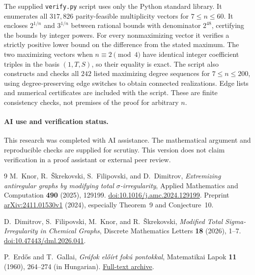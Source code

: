 \documentclass[11pt]{article}
\begin{document}
The supplied \texttt{verify.py} script uses only the Python standard
library. It enumerates all $317{,}826$ parity-feasible multiplicity vectors for
$7\leq n\leq60$. It encloses $2^{1/n}$ and $3^{1/n}$ between rational
bounds with denominator $2^{48}$, certifying the bounds by integer powers.
For every nonmaximizing vector it verifies a strictly positive lower
bound on the difference from the stated maximum. The two maximizing
vectors when $n\equiv2\pmod4$ have identical integer coefficient triples
in the basis $(1,T,S)$, so their equality is exact.
The script also constructs and checks all $242$ listed maximizing
degree sequences for $7\leq n\leq200$, using degree-preserving edge
switches to obtain connected realizations. Edge lists and numerical
certificates are included with the script. These are finite consistency
checks, not premises of the proof for arbitrary $n$.

\paragraph{AI use and verification status.}
This research was completed with AI assistance. The mathematical argument
and reproducible checks are supplied for scrutiny. This version does not
claim verification in a proof assistant or external peer review.

\begin{thebibliography}{9}
M.~Knor, R.~\v Skrekovski, S.~Filipovski, and D.~Dimitrov,
\emph{Extremizing antiregular graphs by modifying total $\sigma$-irregularity},
Applied Mathematics and Computation \textbf{490} (2025), 129199.
\href{https://doi.org/10.1016/j.amc.2024.129199}{doi:10.1016/j.amc.2024.129199}.
Preprint \href{https://arxiv.org/abs/2411.01530v1}{arXiv:2411.01530v1}
(2024), especially Theorem~9 and Conjecture~10.

D.~Dimitrov, S.~Filipovski, M.~Knor, and R.~\v Skrekovski,
\emph{Modified Total Sigma-Irregularity in Chemical Graphs},
Discrete Mathematics Letters \textbf{18} (2026), 1--7.
\href{https://doi.org/10.47443/dml.2026.041}{doi:10.47443/dml.2026.041}.

P.~Erd\H os and T.~Gallai,
\emph{Gr\'afok el\H o\'irt fok\'u pontokkal},
Matematikai Lapok \textbf{11} (1960), 264--274 (in Hungarian).
\href{https://users.renyi.hu/~p_erdos/1961-05.pdf}{Full-text archive}.
\end{thebibliography}
\end{document}
